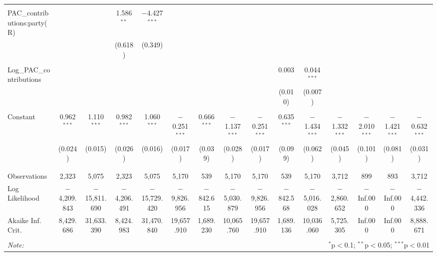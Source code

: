 \begin{tabular}{@{\extracolsep{5pt}}lcccccccccccccc}
  & & & & & & & & & & & & & & \\ 
 PAC\_contributions:party(R) &  &  & 1.586$^{**}$ & $-$4.427$^{***}$ &  &  &  &  &  &  &  &  &  &  \\ 
  &  &  & (0.618) & (0.349) &  &  &  &  &  &  &  &  &  &  \\ 
  & & & & & & & & & & & & & & \\ 
 Log\_PAC\_contributions &  &  &  &  &  &  &  &  & 0.003 & 0.044$^{***}$ &  &  &  &  \\ 
  &  &  &  &  &  &  &  &  & (0.010) & (0.007) &  &  &  &  \\ 
  & & & & & & & & & & & & & & \\ 
 Constant & 0.962$^{***}$ & 1.110$^{***}$ & 0.982$^{***}$ & 1.060$^{***}$ & $-$0.251$^{***}$ & 0.666$^{***}$ & $-$1.137$^{***}$ & $-$0.251$^{***}$ & 0.635$^{***}$ & $-$1.434$^{***}$ & $-$1.332$^{***}$ & $-$2.010$^{***}$ & $-$1.421$^{***}$ & $-$0.632$^{***}$ \\ 
  & (0.024) & (0.015) & (0.026) & (0.016) & (0.017) & (0.039) & (0.028) & (0.017) & (0.099) & (0.062) & (0.045) & (0.101) & (0.081) & (0.031) \\ 
  & & & & & & & & & & & & & & \\ 
\hline \\[-1.8ex] 
Observations & 2,323 & 5,075 & 2,323 & 5,075 & 5,170 & 539 & 5,170 & 5,170 & 539 & 5,170 & 3,712 & 899 & 893 & 3,712 \\ 
Log Likelihood & $-$4,209.843 & $-$15,811.690 & $-$4,206.491 & $-$15,729.420 & $-$9,826.956 & $-$842.615 & $-$5,030.879 & $-$9,826.956 & $-$842.568 & $-$5,016.028 & $-$2,860.652 & $-$Inf.000 & $-$Inf.000 & $-$4,442.336 \\ 
Akaike Inf. Crit. & 8,429.686 & 31,633.390 & 8,424.983 & 31,470.840 & 19,657.910 & 1,689.230 & 10,065.760 & 19,657.910 & 1,689.136 & 10,036.060 & 5,725.305 & Inf.000 & Inf.000 & 8,888.671 \\ 
\hline 
\hline \\[-1.8ex] 
\textit{Note:}  & \multicolumn{14}{r}{$^{*}$p$<$0.1; $^{**}$p$<$0.05; $^{***}$p$<$0.01} \\ 
\end{tabular} 
